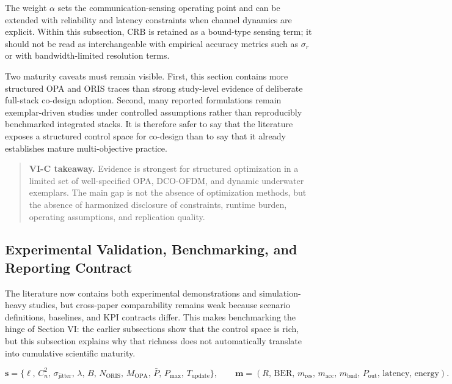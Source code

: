 The weight $\alpha$ sets the communication-sensing operating point and can be extended with reliability and latency constraints when channel dynamics are explicit. Within this subsection, $\mathrm{CRB}$ is retained as a bound-type sensing term; it should not be read as interchangeable with empirical accuracy metrics such as $\sigma_r$ or with bandwidth-limited resolution terms.

Two maturity caveats must remain visible. First, this section contains more structured OPA and ORIS traces than strong study-level evidence of deliberate full-stack co-design adoption. Second, many reported formulations remain exemplar-driven studies under controlled assumptions rather than reproducibly benchmarked integrated stacks. It is therefore safer to say that the literature exposes a structured control space for co-design than to say that it already establishes mature multi-objective practice.

\begin{quote}
\textbf{VI-C takeaway.} Evidence is strongest for structured optimization in a limited set of well-specified OPA, DCO-OFDM, and dynamic underwater exemplars. The main gap is not the absence of optimization methods, but the absence of harmonized disclosure of constraints, runtime burden, operating assumptions, and replication quality.
\end{quote}

\subsection{Experimental Validation, Benchmarking, and Reporting Contract}
\label{sec:enablers-benchmarking}

The literature now contains both experimental demonstrations and simulation-heavy studies, but cross-paper comparability remains weak because scenario definitions, baselines, and KPI contracts differ. This makes benchmarking the hinge of Section VI: the earlier subsections show that the control space is rich, but this subsection explains why that richness does not automatically translate into cumulative scientific maturity.

\begin{equation}
\label{eq:enablers-benchmark}
\mathbf{s}=\{\ell,\,C_n^2,\,\sigma_{\text{jitter}},\,\lambda,\,B,\,N_{\text{ORIS}},\,M_{\text{OPA}},\,\bar P,\,P_{\max},\,T_{\text{update}}\},
\qquad
\mathbf{m}=(R,\,\mathrm{BER},\,m_{\text{res}},\,m_{\text{acc}},\,m_{\text{bnd}},\,P_{\text{out}},\,\text{latency},\,\text{energy}).
\end{equation}

